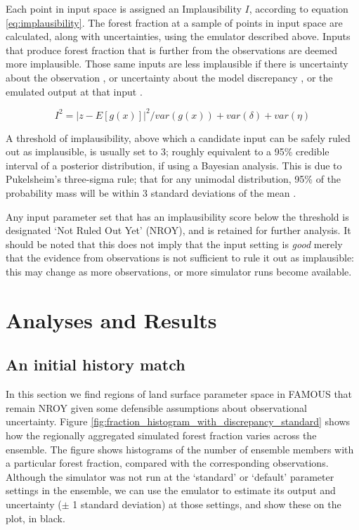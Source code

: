 \documentclass[esd, manuscript]{copernicus}
\begin{document}
Each point in input space is assigned an Implausibility $I$, according to equation \ref{eq:implausibility}. The forest fraction at a sample of points in input space are calculated, along with uncertainties, using the emulator described above. Inputs that produce forest fraction that is further from the observations are deemed more implausible. Those same inputs are less implausible if there is uncertainty  about the observation ,  or uncertainty about the model discrepancy , or the emulated output at that input . 

\begin{equation}\label{eq:eq:implausibility}
I^{2}=  |z -E[g(x)]|^{2} / var(g(x)) +var(\delta) +var(\eta)
\end{equation}

A threshold of implausibility, above which a candidate input can be safely ruled out as implausible, is usually set to 3; roughly equivalent to a 95\% credible interval of a posterior distribution, if using a Bayesian analysis. This is due to Pukelsheim's three-sigma rule; that for any unimodal distribution, 95\% of the probability mass will be within 3 standard deviations of the mean \citep{pukelsheim1994three}.

Any input parameter set that has an implausibility score below the threshold is designated `Not Ruled Out Yet' (NROY), and is retained for further analysis. It should be noted that this does not imply that the input setting is \emph{good} merely that the evidence from observations is not sufficient to rule it out as implausible: this may change as more observations, or more simulator runs become available.

\section{Analyses and Results}\label{AnalysesandResults}

\subsection{An initial history match}\label{initialhistorymatch}
In this section we find regions of land surface parameter space in FAMOUS that remain NROY given some defensible assumptions about observational uncertainty.  Figure \ref{fig:fraction_histogram_with_discrepancy_standard} shows how the regionally aggregated simulated forest fraction varies across the ensemble. The figure shows histograms of the number of ensemble members with a particular forest fraction, compared with the corresponding observations. Although the simulator was not run at the `standard' or `default' parameter settings in the ensemble, we can use the emulator to estimate its output and uncertainty ($\pm$ 1 standard deviation) at those settings, and show these on the plot, in black.
\end{document}
